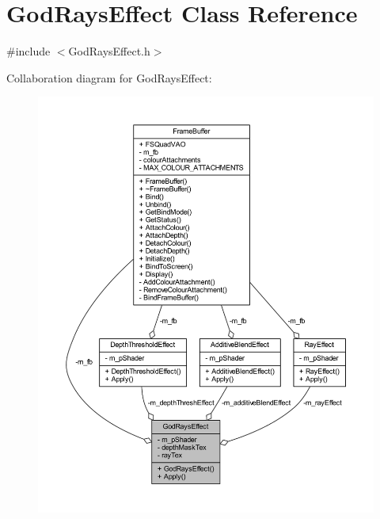 \hypertarget{class_god_rays_effect}{}\section{God\+Rays\+Effect Class Reference}
\label{class_god_rays_effect}


{\ttfamily \#include $<$God\+Rays\+Effect.\+h$>$}



Collaboration diagram for God\+Rays\+Effect\+:\nopagebreak
\begin{figure}[H]
\begin{center}
\leavevmode
\includegraphics[width=350pt]{class_god_rays_effect__coll__graph}
\end{center}
\end{figure}
